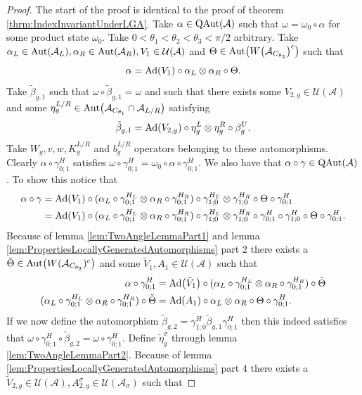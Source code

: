 \documentclass[12pt,a4paper,twoside]{article}
\let\originalleft\left
\let\originalright\right
\renewcommand{\left}{\mathopen{}\mathclose\bgroup\originalleft}
\renewcommand{\right}{\aftergroup\egroup\originalright}
\newcommand{\UU}{\mathcal U}
\renewcommand{\AA}{\mathcal A}
\newcommand{\Ad}[1]{\textrm{Ad}\left(#1\right)}
\newcommand{\Aut}[1]{\textrm{Aut}\left(#1\right)}
\newcommand{\QAut}[1]{\textrm{QAut}\left(#1\right)}
\theoremstyle{definition}
\numberwithin{equation}{section}
\begin{document}
\begin{proof}
	The start of the proof is identical to the proof of theorem \ref{thrm:IndexInvariantUnderLGA}. Take $\alpha\in\QAut{\AA}$ such that $\omega=\omega_0\circ\alpha$ for some product state $\omega_0$. Take $0<\theta_1<\theta_2<\theta_3<\pi/2$ arbitrary. Take $\alpha_L\in\Aut{\AA_L},\alpha_R\in\Aut{\AA_R},V_1\in\UU(\AA)$ and $\Theta\in\Aut{W\left(\AA_{C_{\theta_3}}\right)^c}$ such that
	\begin{equation}
		\alpha=\Ad{V_1}\circ\alpha_L\otimes\alpha_R\circ\Theta.
	\end{equation}
	Take $\tilde{\beta}_{g,1}$ such that $\omega\circ\tilde{\beta}_{g,1}=\omega$ and such that there exists some $V_{2,g}\in\UU(\AA)$ and some $\eta_g^{L/R}\in\Aut{\AA_{C_{\theta_1}}\cap\AA_{L/R}}$ satisfying
	\begin{equation}
		\tilde{\beta}_{g,1}=\Ad{V_{2,g}}\circ\eta_{g}^L\otimes\eta_{g}^R\circ\beta_g^U.
	\end{equation}
	Take $W_g,v,w,K_g^{L/R}$ and $b_g^{L/R}$ operators belonging to these automorphisms. Clearly $\alpha\circ\gamma^H_{0;1}$ satisfies $\omega\circ\gamma^{H}_{0;1}=\omega_0\circ\alpha\circ\gamma^{H}_{0;1}$. We also have that $\alpha\circ\gamma\in\QAut{\AA}$. To show this notice that
	\begin{align}
		\alpha\circ\gamma&=\Ad{V_1}\circ(\alpha_L\circ\gamma^{H_L}_{0;1}\otimes\alpha_R\circ\gamma^{H_R}_{0;1})\circ\gamma^{H_L}_{1;0}\otimes\gamma^{H_R}_{1;0}\circ\Theta\circ\gamma^H_{0;1}\\
		&=\Ad{V_1}\circ(\alpha_L\circ\gamma^{H_L}_{0;1}\otimes\alpha_R\circ\gamma^{H_R}_{0;1})\circ\gamma^{H_L}_{1;0}\otimes\gamma^{H_R}_{1;0}\circ\gamma^{H}_{0;1}\circ\gamma^{H}_{1;0}\circ\Theta\circ\gamma^H_{0;1}.
	\end{align}
	Because of lemma \ref{lem:TwoAngleLemmaPart1} and lemma \ref{lem:PropertiesLocallyGeneratedAutomorphisms} part 2 there exists a $\tilde{\Theta}\in\Aut{W(\AA_{C_{\theta_2}})^c}$ and some $\tilde V_1,A_1\in\UU(\AA)$ such that
	\begin{align}
		\alpha\circ\gamma^H_{0;1}&=\Ad{\tilde V_1}\circ(\alpha_L\circ\gamma^{H_L}_{0;1}\otimes\alpha_R\circ\gamma^{H_R}_{0;1})\circ\tilde\Theta\\
		(\alpha_L\circ\gamma^{H_L}_{0;1}\otimes\alpha_R\circ\gamma^{H_R}_{0;1})\circ\tilde\Theta&=\Ad{A_1}\circ \alpha_L\otimes\alpha_R\circ\Theta\circ\gamma^{H}_{0;1}.
	\end{align}
	If we now define the automorphism $\tilde{\beta}_{g,2}=\gamma^{H}_{1;0}\tilde\beta_{g,1}\gamma^{H}_{0;1}$ then this indeed satisfies that $\omega\circ\gamma^{H}_{0;1}\circ\tilde{\beta}_{g,2}=\omega\circ\gamma^{H}_{0;1}$. Define $\tilde\eta_g^\sigma$ through lemma \ref{lem:TwoAngleLemmaPart2}. Because of lemma \ref{lem:PropertiesLocallyGeneratedAutomorphisms} part 4 there exists a $\tilde V_{2,g}\in\UU(\AA),A_{2,g}^{\sigma}\in\UU(\AA_\sigma)$ such that

\end{proof}
\end{document}
